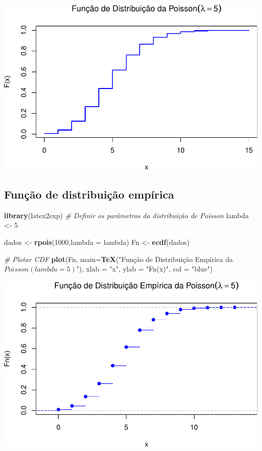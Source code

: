 \documentclass[
]{book}
\newenvironment{Shaded}{\begin{snugshade}}{\end{snugshade}}
\newcommand{\AttributeTok}[1]{\textcolor[rgb]{0.13,0.29,0.53}{#1}}
\newcommand{\CommentTok}[1]{\textcolor[rgb]{0.56,0.35,0.01}{\textit{#1}}}
\newcommand{\DecValTok}[1]{\textcolor[rgb]{0.00,0.00,0.81}{#1}}
\newcommand{\FunctionTok}[1]{\textcolor[rgb]{0.13,0.29,0.53}{\textbf{#1}}}
\newcommand{\NormalTok}[1]{#1}
\newcommand{\OtherTok}[1]{\textcolor[rgb]{0.56,0.35,0.01}{#1}}
\newcommand{\StringTok}[1]{\textcolor[rgb]{0.31,0.60,0.02}{#1}}
\begin{document}
\includegraphics{introR_files/figure-latex/unnamed-chunk-264-1.pdf}

\subsection{Função de distribuição empírica}\label{funuxe7uxe3o-de-distribuiuxe7uxe3o-empuxedrica-2}

\begin{Shaded}
\begin{Highlighting}[]
\FunctionTok{library}\NormalTok{(latex2exp)}
\CommentTok{\# Definir os parâmetros da distribuição de Poisson}
\NormalTok{lambda }\OtherTok{\textless{}{-}} \DecValTok{5}

\NormalTok{dados }\OtherTok{\textless{}{-}} \FunctionTok{rpois}\NormalTok{(}\DecValTok{1000}\NormalTok{,}\AttributeTok{lambda =}\NormalTok{ lambda)}
\NormalTok{Fn }\OtherTok{\textless{}{-}} \FunctionTok{ecdf}\NormalTok{(dados)}

\CommentTok{\# Plotar CDF}
\FunctionTok{plot}\NormalTok{(Fn, }\AttributeTok{main=}\FunctionTok{TeX}\NormalTok{(}\StringTok{"Função de Distribuição Empírica da $Poisson(lambda = 5)$"}\NormalTok{),}
  \AttributeTok{xlab =} \StringTok{"x"}\NormalTok{,     }
  \AttributeTok{ylab =} \StringTok{"Fn(x)"}\NormalTok{,      }
  \AttributeTok{col =} \StringTok{"blue"}\NormalTok{)}
\end{Highlighting}
\end{Shaded}

\includegraphics{introR_files/figure-latex/unnamed-chunk-265-1.pdf}
\end{document}
